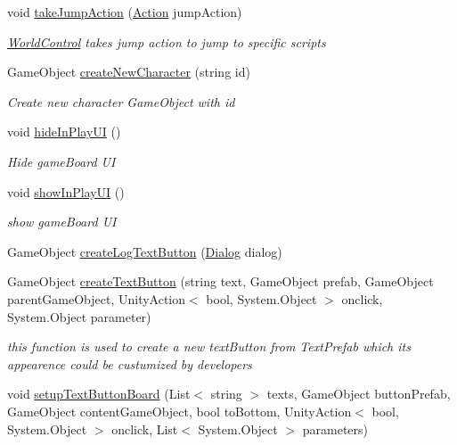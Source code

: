 \begin{DoxyCompactItemize}
void \hyperlink{class_world_control_a7cab11edb738b3ccf8e343c285787539}{take\+Jump\+Action} (\hyperlink{classdoki_script_setting_1_1_action}{Action} jump\+Action)
\begin{DoxyCompactList}\small\item\em \hyperlink{class_world_control}{World\+Control} takes jump action to jump to specific scripts \end{DoxyCompactList}\item 
Game\+Object \hyperlink{class_world_control_a28450c3b696344dc748ad7ae4b0ccbea}{create\+New\+Character} (string id)
\begin{DoxyCompactList}\small\item\em Create new character Game\+Object with id \end{DoxyCompactList}\item 
void \hyperlink{class_world_control_a7898db419ff86ed269ca28991a15e1e2}{hide\+In\+Play\+UI} ()
\begin{DoxyCompactList}\small\item\em Hide game\+Board UI \end{DoxyCompactList}\item 
void \hyperlink{class_world_control_a69d9085a7778177783d4d734f6c0f9cf}{show\+In\+Play\+UI} ()
\begin{DoxyCompactList}\small\item\em show game\+Board UI \end{DoxyCompactList}\item 
Game\+Object \hyperlink{class_world_control_a98e0b5ae89cddbb9b84891272a916772}{create\+Log\+Text\+Button} (\hyperlink{class_dialog}{Dialog} dialog)
\item 
Game\+Object \hyperlink{class_world_control_afe5e1c1764f81e29e27ae6f743337bbf}{create\+Text\+Button} (string text, Game\+Object prefab, Game\+Object parent\+Game\+Object, Unity\+Action$<$ bool, System.\+Object $>$ onclick, System.\+Object parameter)
\begin{DoxyCompactList}\small\item\em this function is used to create a new text\+Button from Text\+Prefab which its appearence could be custumized by developers \end{DoxyCompactList}\item 
void \hyperlink{class_world_control_ae55616b0aa0756ff92dc7b9227dafcd4}{setup\+Text\+Button\+Board} (List$<$ string $>$ texts, Game\+Object button\+Prefab, Game\+Object content\+Game\+Object, bool to\+Bottom, Unity\+Action$<$ bool, System.\+Object $>$ onclick, List$<$ System.\+Object $>$ parameters)

\end{DoxyCompactItemize}

